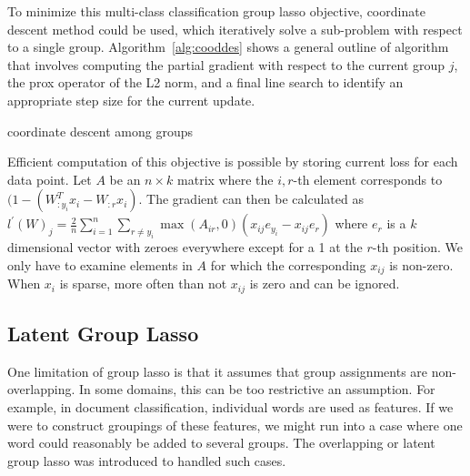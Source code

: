 \documentclass[11pt]{article}
\begin{document}
To minimize this multi-class classification group lasso objective, coordinate descent method could be used, which iteratively solve a sub-problem with respect to a 
single group. Algorithm~\ref{alg:cooddes} shows a general outline of algorithm that involves
computing the partial gradient with respect to the 
current group $j$, the prox
operator of the L2 norm, and a final line search to identify an appropriate
step size for the current update.

\begin{algorithm}
\caption{coordinate descent among groups}
\label{alg:cooddes}
\end{algorithm}

Efficient computation of this objective is possible by storing current 
loss for each data point. Let $A$ be an $n\times k$ matrix where the 
$i,r$-th element corresponds to 
 $(1-(W_{:y_i}^Tx_i - W_{:r}x_i).$
 The gradient can then be calculated as 
 $l^\prime(W)_{j} = \frac{2}{n}\sum_{i=1}^n\sum_{r\ne y_i}
 \max(A_{ir}, 0)(x_{ij}e_{y_i} - x_{ij} e_r)$
where $e_r$ is a $k$ dimensional vector with zeroes everywhere except for a 1
at the $r$-th position. We only have to examine elements in $A$ for which 
the corresponding $x_{ij}$ is non-zero. When $x_{i}$ is sparse, more often
than not $x_{ij}$ is zero and can be ignored.

\subsection{Latent Group Lasso}

One limitation of group lasso is that it assumes that group assignments are
non-overlapping. In some domains, this can be too restrictive an assumption.
For example, in document classification, individual words are used as features.
If we were to construct groupings of these features, we might run into a case
where one word could reasonably be added to several groups. The overlapping or
latent group lasso was introduced to handled such cases.\\
\end{document}
